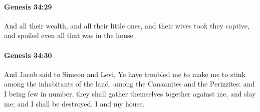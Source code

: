 		\paragraph{Genesis 34:29} %
			\label{GENESIS-34-29}

			And all their wealth, and all their little ones, and their wives took they captive, and spoiled even all that was in the house.


		\paragraph{Genesis 34:30} %
			\label{GENESIS-34-30}

			And Jacob said to Simeon and Levi, Ye have troubled me to make me to stink among the inhabitants of the land, among the Canaanites and the Perizzites: and I being few in number, they shall gather themselves together against me, and slay me; and I shall be destroyed, I and my house.

